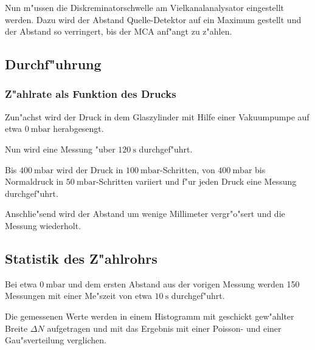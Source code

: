 	Nun m"ussen die Diskreminatorschwelle am Vielkanalanalysator eingestellt werden. Dazu wird der Abstand Quelle-Detektor auf ein Maximum gestellt und der Abstand so verringert, bis der MCA anf"angt zu z"ahlen.

	\subsection{Durchf"uhrung} %
	\label{sub:durchf_uhrung}
	

	\subsubsection{Z"ahlrate als Funktion des Drucks} %
	\label{sub:subsection_name}
	
	Zun"achst wird der Druck in dem Glaszylinder mit Hilfe einer Vakuumpumpe auf etwa $\SI{0}{\milli\bar}$ herabgesengt.

	Nun wird eine Messung "uber $\SI{120}{\second}$ durchgef"uhrt.

	Bis $\SI{400}{\milli\bar}$ wird der Druck in $\SI{100}{\milli\bar}$-Schritten, von $\SI{400}{\milli\bar}$ bis Normaldruck in $\SI{50}{\milli\bar}$-Schritten variiert und f"ur jeden Druck eine Messung durchgef"uhrt.

	Anschlie"send wird der Abstand um wenige Millimeter vergr"o"sert und die Messung wiederholt.

	\subsection{Statistik des Z"ahlrohrs} %
	\label{sub:statistik_des_z_ahlrohrs}
	
	Bei etwa $\SI{0}{\milli\bar}$ und dem ersten Abstand aus der vorigen Messung werden 150 Messungen mit einer Me"szeit von etwa $\SI{10}{\second}$ durchgef"uhrt.

	Die gemessenen Werte werden in einem Histogramm mit geschickt gew"ahlter Breite $\Delta N$ aufgetragen und mit das Ergebnis mit einer Poisson- und einer Gau"sverteilung verglichen.